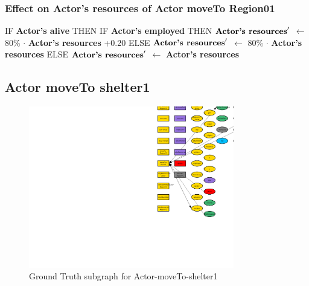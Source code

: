 \documentclass{article}%
\begin{document}
\subsubsection{Effect on Actor's resources of Actor moveTo Region01}%
\label{ssubsec:Effect on Actor's resources of Actor moveTo Region01}%
\begin{flushleft}%
IF %
\textbf{Actor's alive}%
\linebreak%
\hspace*{2em}%
THEN %
IF %
\textbf{Actor's employed}%
\linebreak%
\hspace*{4em}%
THEN %
$\mbox{\textbf{Actor's resources}} '$%
$\leftarrow$%
80\%%
$\cdot$%
\textbf{Actor's resources}%
+0.20%
\linebreak%
\hspace*{4em}%
ELSE %
$\mbox{\textbf{Actor's resources}} '$%
$\leftarrow$%
80\%%
$\cdot$%
\textbf{Actor's resources}%
\linebreak%
\hspace*{2em}%
ELSE %
$\mbox{\textbf{Actor's resources}} '$%
$\leftarrow$%
\textbf{Actor's resources}%
\end{flushleft}

%
\subsection{Actor moveTo shelter1}%
\label{subsec:Actor moveTo shelter1}%


\begin{figure}[ht]%
\centering%
\includegraphics[width=0.8\textwidth]{images/Actor-moveTo-shelter1.png}%
\caption{Ground Truth subgraph for Actor{-}moveTo{-}shelter1}%
\end{figure}
\end{document}
